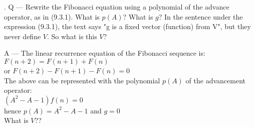 \documentclass{article}
\newcounter{question}
\begin{document}
\newcommand\Que[1]{%
   \leavevmode\par
   \stepcounter{question}
   \noindent
   \thequestion. Q --- #1\par}

\newcommand\Ans[2][]{%
    \leavevmode\par\noindent
   {\leftskip37pt
    A --- \textbf{#1}#2\par}}

\Que{
    Rewrite the Fibonacci equation using a polynomial of the advance operator, 
    as in (9.3.1). What is $p(A)$? What is $g$? 
    In the sentence under the expression (9.3.1), 
    the text says "g is a fixed vector (function) from V", 
    but they never define $V$. So what is this $V$?
    }
\Ans{
    The linear recurrence equation of the Fibonacci sequence is:\\

    $
    F(n+2) = F(n+1) + F(n)
    $\\

    or $
    F(n+2) - F(n+1) - F(n) = 0
    $\\

    The above can be represented with the polynomial
    $p(A)$ of the advancement operator:\\

    $
    (A^2-A-1)f(n) = 0
    $\\

    hence $p(A) = A^2-A-1$ and $g=0$\\

    What is $V$??
    }
\end{document}
